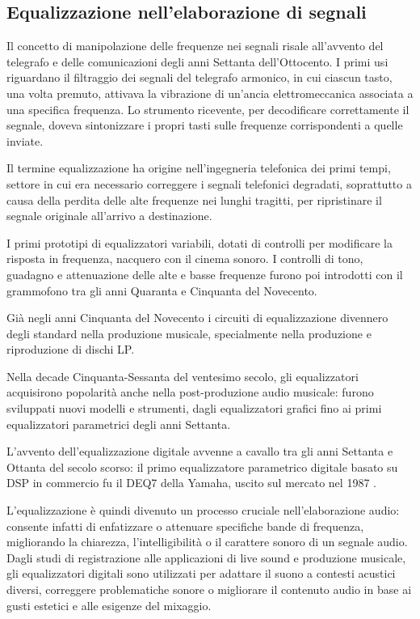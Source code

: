 \documentclass[12pt]{report}
\begin{document}
\subsection{Equalizzazione nell'elaborazione di segnali}
Il concetto di manipolazione delle frequenze nei segnali risale all’avvento del telegrafo e delle comunicazioni degli anni Settanta dell'Ottocento. I primi usi riguardano il filtraggio dei segnali del telegrafo armonico, in cui ciascun tasto, una volta premuto, attivava la vibrazione di un’ancia elettromeccanica associata a una specifica frequenza. Lo strumento ricevente, per decodificare correttamente il segnale, doveva sintonizzare i propri tasti sulle frequenze corrispondenti a quelle inviate.

Il termine equalizzazione ha origine nell'ingegneria telefonica dei primi tempi, settore in cui era necessario correggere i segnali telefonici degradati, soprattutto a causa della perdita delle alte frequenze nei lunghi tragitti, per ripristinare il segnale originale all'arrivo a destinazione.

I primi prototipi di equalizzatori variabili, dotati di controlli per modificare la risposta in frequenza, nacquero con il cinema sonoro. I controlli di tono, guadagno e attenuazione delle alte e basse frequenze furono poi introdotti con il grammofono tra gli anni Quaranta e Cinquanta del Novecento.

Già negli anni Cinquanta del Novecento i circuiti di equalizzazione divennero degli standard nella produzione musicale, specialmente nella produzione e riproduzione di dischi LP.

Nella decade Cinquanta-Sessanta del ventesimo secolo, gli equalizzatori acquisirono popolarità anche nella post-produzione audio musicale: furono sviluppati nuovi modelli e strumenti, dagli equalizzatori grafici fino ai primi equalizzatori parametrici degli anni Settanta.

L'avvento dell'equalizzazione digitale avvenne a cavallo tra gli anni Settanta e Ottanta del secolo scorso: il primo equalizzatore parametrico digitale basato su DSP in commercio fu il DEQ7 della Yamaha, uscito sul mercato nel 1987 \parencite{reiss2016all}.

L'equalizzazione è quindi divenuto un processo cruciale nell'elaborazione audio: consente infatti di enfatizzare o attenuare specifiche bande di frequenza, migliorando la chiarezza, l'intelligibilità o il carattere sonoro di un segnale audio. Dagli studi di registrazione alle applicazioni di live sound e produzione musicale, gli equalizzatori digitali sono utilizzati per adattare il suono a contesti acustici diversi, correggere problematiche sonore o migliorare il contenuto audio in base ai gusti estetici e alle esigenze del mixaggio.
\end{document}
